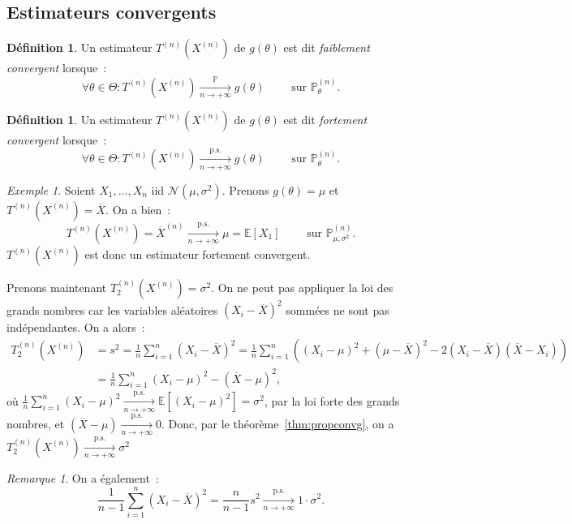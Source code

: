 \documentclass{report}
\renewcommand{\P}{\mathbb P}
\newcommand{\E}{\mathbb E}
\newcommand{\pinfty}{{+\infty}}
\newcommand{\cvgp}{\xrightarrow[n \to \pinfty]{\P}}
\newcommand{\ps}{{\text{p.s.}}}
\newcommand{\cvgps}{\xrightarrow[n \to \pinfty]\ps}
\newcommand{\Nms}{\mathcal N(\mu, \sigma^2)}
\theoremstyle{definition}
\newtheorem{déf}[thm]{Définition}
\theoremstyle{remark}
\newtheorem*{rmq}{Remarque}
\newtheorem{ex}{Exemple}[chapter]
\begin{document}
		\subsection{Estimateurs convergents}
			\begin{déf} Un estimateur $T^{(n)}(X^{(n)})$ de $g(\theta)$ est dit \textit{faiblement convergent} lorsque~:
			\[\forall \theta \in \Theta : T^{(n)}(X^{(n)}) \cvgp g(\theta) \qquad \text{ sur }\P_\theta^{(n)}.\]
			\end{déf}

			\begin{déf} Un estimateur $T^{(n)}(X^{(n)})$ de $g(\theta)$ est dit \textit{fortement convergent} lorsque~:
			\[\forall \theta \in \Theta : T^{(n)}(X^{(n)}) \cvgps g(\theta)\qquad \text{ sur }\P_\theta^{(n)}.\]
			\end{déf}

			\begin{ex} Soient $X_1, \ldots, X_n$ iid $\Nms$. Prenons $g(\theta) = \mu$ et $T^{(n)}(X^{(n)}) = \overline X$. On a bien~:
			\[T^{(n)}(X^{(n)}) = \overline X^{(n)} \cvgps \mu = \E[X_1] \qquad \text{ sur }\P_{\mu, \sigma^2}^{(n)}.\]
			$T^{(n)}(X^{(n)})$ est donc un estimateur fortement convergent.

			Prenons maintenant $T_2^{(n)}(X^{(n)}) = \sigma^2$. On ne peut pas appliquer la loi des grands nombres car les variables aléatoires $(X_i - \overline X)^2$
			sommées ne sont pas indépendantes. On a alors~:
			\begin{align*}
				T_2^{(n)}(X^{(n)}) &= s^2 = \frac 1n\sum_{i=1}^n(X_i-\overline X)^2
					= \frac 1n\sum_{i=1}^n\left((X_i - \mu)^2 + (\mu - \overline X)^2 - 2(X_i - \overline X)(\overline X - X_i)\right) \\
				&= \frac 1n\sum_{i=1}^n(X_i - \mu)^2 - (\overline X - \mu)^2,
			\end{align*}
			où $\frac 1n\sum_{i=1}^n(X_i-\mu)^2 \cvgps \E\left[(X_i - \mu)^2\right] = \sigma^2$, par la loi forte des grands nombres,
			et $(\overline X - \mu) \cvgps 0$. Donc, par le théorème~\ref{thm:propconvg}, on a $T_2^{(n)}(X^{(n)}) \cvgps \sigma^2$
			\end{ex}

			\begin{rmq} On a également~:
			\[\frac 1{n-1}\sum_{i=1}^n(X_i-\overline X)^2 = \frac n{n-1}s^2 \cvgps 1 \cdot \sigma^2.\]
			\end{rmq}
\end{document}
